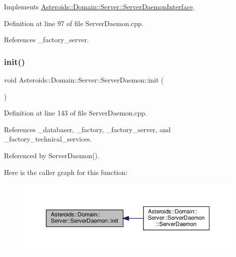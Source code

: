 Implements \hyperlink{classAsteroids_1_1Domain_1_1Server_1_1ServerDaemonInterface_a80d5e04ec214d4eb673d2aac1428deca}{Asteroids\+::\+Domain\+::\+Server\+::\+Server\+Daemon\+Interface}.



Definition at line 97 of file Server\+Daemon.\+cpp.



References \+\_\+factory\+\_\+server.

\mbox{\label{classAsteroids_1_1Domain_1_1Server_1_1ServerDaemon_ae9c4ad2dfbabb9f2f2fbd84fbf5940a5}} 
\subsubsection{\texorpdfstring{init()}{init()}}
{\footnotesize\ttfamily void Asteroids\+::\+Domain\+::\+Server\+::\+Server\+Daemon\+::init (\begin{DoxyParamCaption}{ }\end{DoxyParamCaption})\hspace{0.3cm}{\ttfamily [private]}}



Definition at line 143 of file Server\+Daemon.\+cpp.



References \+\_\+databaser, \+\_\+factory, \+\_\+factory\+\_\+server, and \+\_\+factory\+\_\+technical\+\_\+services.



Referenced by Server\+Daemon().

Here is the caller graph for this function\+:\nopagebreak
\begin{figure}[H]
\begin{center}
\leavevmode
\includegraphics[width=350pt]{classAsteroids_1_1Domain_1_1Server_1_1ServerDaemon_ae9c4ad2dfbabb9f2f2fbd84fbf5940a5_icgraph}
\end{center}
\end{figure}
\mbox{\label{classAsteroids_1_1Domain_1_1Server_1_1ServerDaemon_a3cafc61bfa34d7af93f6d50a36380da0}} 

